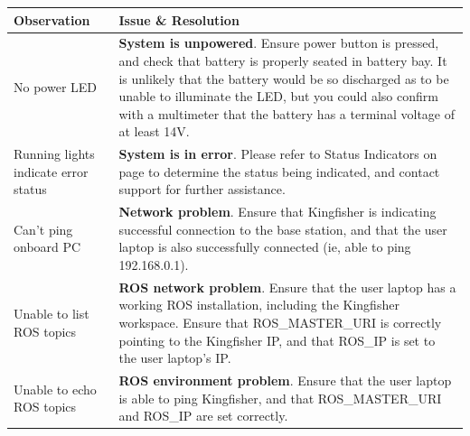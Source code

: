 \documentclass[]{clearpath-latex/clearpath-manual}
\begin{document}
\bgroup
\def\arraystretch{1.5}%
\begin{table}[h]
\centering
\label{troublshooting}
\begin{tabular}{p{} p{}}

\rowcolor{lightgrey} 
{\bf Observation}                    & {\bf Issue \& Resolution}                                                                                                                                                                                                                                                                                          \\ \hline
No power LED                         & \textbf{System is unpowered}. Ensure power button is pressed, and check that battery is properly seated in battery bay. It is unlikely that the battery would be so discharged as to be unable to illuminate the LED, but you could also confirm with a multimeter that the battery has a terminal voltage of at least 14V. \\ \hline
Running lights indicate error status & \textbf{System is in error}. Please refer to Status Indicators on page \pageref{statusindicators} to determine the status being indicated, and contact support for further assistance.                                                                                                                                                               \\ \hline
Can’t ping onboard PC                & \textbf{Network problem}. Ensure that Kingfisher is indicating successful connection to the base station, and that the user laptop is also successfully connected (ie, able to ping 192.168.0.1).                                                                                                                           \\ \hline
Unable to list ROS topics            & \textbf{ROS network problem}. Ensure that the user laptop has a working ROS installation, including the Kingfisher workspace. Ensure that ROS\_MASTER\_URI is correctly pointing to the Kingfisher IP, and that ROS\_IP is set to the user laptop’s IP.                                                                     \\ \hline
Unable to echo ROS topics            & \textbf{ROS environment problem}. Ensure that the user laptop is able to ping Kingfisher, and that ROS\_MASTER\_URI and ROS\_IP are set correctly.                                                                                                                                                                          \\ \hline
\end{tabular}
\end{table}
\egroup
\end{document}
